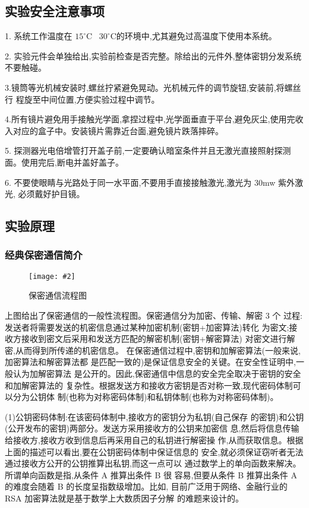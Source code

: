 \documentclass[11pt,a4paper]{ctexart}
\newcommand{\cpic}[2]{
\begin{center}
\texttt{[image: \#2]}
\end{center}
}
\newcommand{\cpicn}[3]
{
\begin{figure}[H]
\cpic{#1}{#2}
\caption{\color{red}#3\label{#2}}
\end{figure}
}
\begin{document}
\subsection{实验安全注意事项}

1. 系统工作温度在 $15^{\circ}$C~ $30^{\circ}$C的环境中,尤其避免过高温度下使用本系统。

2. 实验元件会单独给出,实验前检查是否完整。除给出的元件外,整体密钥分发系统不要触碰。

3.镜筒等光机械安装时,螺丝拧紧避免晃动。光机械元件的调节旋钮,安装前,将螺丝行
程旋至中间位置,方便实验过程中调节。

4.所有镜片避免用手接触光学面,拿捏过程中,光学面垂直于平台,避免灰尘,使用完收
入对应的盒子中。安装镜片需靠近台面,避免镜片跌落摔碎。

5.
探测器光电倍增管打开盖子前,一定要确认暗室条件并且无激光直接照射探测面。使用完后,断电并盖好盖子。

6.
不要使眼睛与光路处于同一水平面,不要用手直接接触激光,激光为 30mw 紫外激光,
必须戴好护目镜。

\subsection{实验原理}
\subsubsection{经典保密通信简介}
\cpicn{0.3}{classical}{保密通信流程图}
上图给出了保密通信的一般性流程图。保密通信分为加密、传输、解密 3 个
过程:发送者将需要发送的机密信息通过某种加密机制(密钥+加密算法)转化
为密文;接收方接收到密文后采用和发送方匹配的解密机制(密钥+解密算法)
对密文进行解密,从而得到所传递的机密信息。
在保密通信过程中,密钥和加解密算法(一般来说,加密算法和解密算法都
是匹配一致的)是保证信息安全的关键。在安全性证明中,一般认为加解密算法
是公开的。因此,保密通信中信息的安全完全取决于密钥的安全和加解密算法的
复杂性。根据发送方和接收方密钥是否对称一致,现代密码体制可以分为公钥体
制(也称为对称密码体制)和私钥体制(也称为对称密码体制)。

(1)公钥密码体制:在该密码体制中,接收方的密钥分为私钥(自己保存
的密钥)和公钥(公开发布的密钥)两部分。发送方采用接收方的公钥来加密信
息,然后将信息传输给接收方,接收方收到信息后再采用自己的私钥进行解密操
作,从而获取信息。根据上面的描述可以看出,要在公钥密码体制中保证信息的
安全,就必须保证窃听者无法通过接收方公开的公钥推算出私钥,而这一点可以
通过数学上的单向函数来解决。所谓单向函数是指,从条件 A 推算出条件 B 很
容易,但要从条件 B 推算出条件 A 的难度会随着 B 的长度呈指数级增加。比如,
目前广泛用于网络、金融行业的 RSA 加密算法就是基于数学上大数质因子分解
的难题来设计的。
\end{document}
